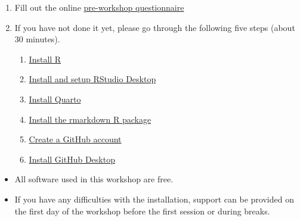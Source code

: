 \documentclass[
  letterpaper,
  DIV=11,
  numbers=noendperiod]{scrartcl}
\providecommand{\tightlist}{%
  \setlength{\itemsep}{0pt}\setlength{\parskip}{0pt}}\usepackage{longtable,booktabs,array}
\begin{document}
\begin{enumerate}
\def\labelenumi{\arabic{enumi}.}
\item
  Fill out the online
  \href{https://timicodktest.smartforest.de/-/single/cac06e76b3e163e655e49626f8129de8f55a8035ced54f15bc4c6cf527dba8a7?st=DnBRz677PIYh33ML0rE1amWzyhCIYPGFQnmZ6AAou8nJFyikWN6nLM5i3G4I0YZN}{pre-workshop
  questionnaire}
\item
  If you have not done it yet, please go through the following five
  steps (about 30 minutes).

  \begin{enumerate}
  \def\labelenumii{\alph{enumii}.}
  \item
    \href{https://thaliehln.github.io/ds4ph/r_setup.html\#sec-R-installation}{Install
    R}
  \item
    \href{https://thaliehln.github.io/ds4ph/r_setup.html\#sec-RStudio-installation}{Install
    and setup RStudio Desktop}
  \item
    \href{https://thaliehln.github.io/ds4ph/r_setup.html\#sec-Quarto-installation}{Install
    Quarto}
  \item
    \href{https://thaliehln.github.io/ds4ph/r_setup.html\#sec-rmarkdown-installation}{Install
    the rmarkdown R package}
  \item
    \href{https://thaliehln.github.io/ds4ph/github_setup.html\#sec-GitHub-account-creation}{Create
    a GitHub account}
  \item
    \href{https://thaliehln.github.io/ds4ph/github_setup.html\#sec-GitHub-Desktop-installation}{Install
    GitHub Desktop}
  \end{enumerate}
\end{enumerate}

\begin{tcolorbox}[enhanced jigsaw, colframe=quarto-callout-note-color-frame, breakable, leftrule=.75mm, title=\textcolor{quarto-callout-note-color}{\faInfo}\hspace{0.5em}{Note}, colback=white, bottomtitle=1mm, opacitybacktitle=0.6, colbacktitle=quarto-callout-note-color!10!white, arc=.35mm, toptitle=1mm, titlerule=0mm, opacityback=0, rightrule=.15mm, bottomrule=.15mm, toprule=.15mm, left=2mm, coltitle=black]

\begin{itemize}
\tightlist
\item
  All software used in this workshop are free.
\item
  If you have any difficulties with the installation, support can be
  provided on the first day of the workshop before the first session or
  during breaks.
\end{itemize}

\end{tcolorbox}
\end{document}
